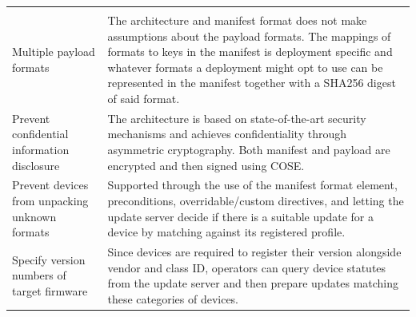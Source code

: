 \documentclass[0-thesis.tex]{subfiles}
\begin{document}
\begin{longtable}[]{@{}ll@{}}
\begin{minipage}[t]{0.53\columnwidth}
    \end{minipage}\tabularnewline
    \begin{minipage}[t]{0.41\columnwidth}\raggedright\strut
    Multiple payload formats\strut
    \end{minipage} & \begin{minipage}[t]{0.53\columnwidth}\raggedright\strut
    The architecture and manifest format does not make assumptions about the
    payload formats. The mappings of formats to keys in the manifest is
    deployment specific and whatever formats a deployment might opt to use
    can be represented in the manifest together with a SHA256 digest of said
    format.\strut
    \end{minipage}\tabularnewline
    \begin{minipage}[t]{0.41\columnwidth}\raggedright\strut
    Prevent confidential information disclosure\strut
    \end{minipage} & \begin{minipage}[t]{0.53\columnwidth}\raggedright\strut
    The architecture is based on state-of-the-art security mechanisms and
    achieves confidentiality through asymmetric cryptography. Both manifest
    and payload are encrypted and then signed using COSE.\strut
    \end{minipage}\tabularnewline
    \begin{minipage}[t]{0.41\columnwidth}\raggedright\strut
    Prevent devices from unpacking unknown formats\strut
    \end{minipage} & \begin{minipage}[t]{0.53\columnwidth}\raggedright\strut
    Supported through the use of the manifest format element, preconditions,
    overridable/custom directives, and letting the update server decide if
    there is a suitable update for a device by matching against its
    registered profile.\strut
    \end{minipage}\tabularnewline
    \begin{minipage}[t]{0.41\columnwidth}\raggedright\strut
    Specify version numbers of target firmware\strut
    \end{minipage} & \begin{minipage}[t]{0.53\columnwidth}\raggedright\strut
    Since devices are required to register their version alongside vendor
    and class ID, operators can query device statutes from the update server
    and then prepare updates matching these categories of devices.\strut
    \end{minipage}\tabularnewline

\end{longtable}
\end{document}
